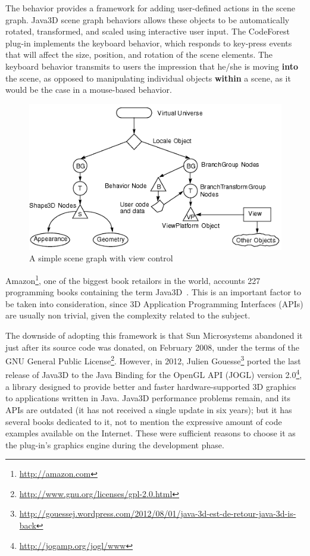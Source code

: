 The behavior provides a framework for adding user-defined actions in the scene
graph. Java3D scene graph behaviors allows these objects to be automatically
rotated, transformed, and scaled using interactive user input. The CodeForest
plug-in implements the keyboard behavior, which responds to key-press events
that will affect the size, position, and rotation of the scene elements. The
keyboard behavior transmits to users the impression that he/she is moving
\textbf{into} the scene, as opposed to manipulating individual objects
\textbf{within} a scene, as it would be the case in a mouse-based behavior.

\begin{figure}[h!]
\centering
\includegraphics[width=\textwidth]{figures/java3d-overview}
\caption{A simple scene graph with view control}
\label{fig:java3d-overview}
\end{figure}

Amazon\footnote{\url{http://amazon.com}}, one of the biggest book retailors in
the world, accounts 227 programming books containing the term
Java3D~\cite{amazon2014java3d}. This is an important factor to be taken into
consideration, since 3D Application Programming Interfaces (APIs) are usually
non trivial, given the complexity related to the subject.

The downside of adopting this framework is that Sun Microsystems abandoned it
just after its source code was donated, on February 2008, under the terms of the
GNU General Public
License\footnote{\url{http://www.gnu.org/licenses/gpl-2.0.html}}. However, in
2012, Julien
Gouesse\footnote{\url{http://gouessej.wordpress.com/2012/08/01/java-3d-est-de-retour-java-3d-is-back}}
ported the last release of Java3D to the Java Binding for the OpenGL API (JOGL)
version 2.0\footnote{\url{http://jogamp.org/jogl/www}}, a library designed to
provide better and faster hardware-supported 3D graphics to applications written
in Java.
Java3D performance problems remain, and its APIs are outdated (it has not
received a single update in six years); but it has several books dedicated to
it, not to mention the expressive amount of code examples available on the
Internet.
These were sufficient reasons to choose it as the plug-in's graphics engine
during the development phase.

